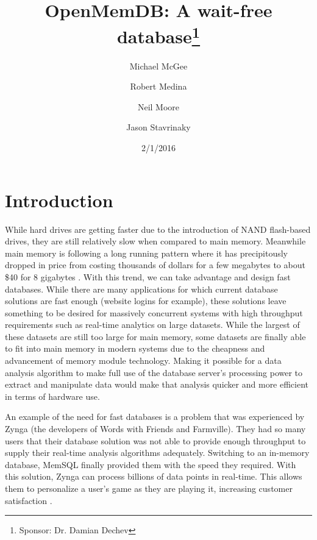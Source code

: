 \documentclass[letter,11pt]{article}
\title{OpenMemDB: A wait-free database\thanks{Sponsor: Dr. Damian Dechev}}
\author{Michael McGee \and Robert Medina \and Neil Moore \and Jason Stavrinaky}
\date{2/1/2016}
\begin{document}
\maketitle
\newpage


\section{Introduction}
While hard drives are getting faster due to the introduction of NAND flash-based drives,
they are still relatively slow when compared to main memory. Meanwhile main memory is following a long running 
pattern where it has precipitously dropped in price from costing thousands of dollars for a few 
megabytes to about \$40 for 8 gigabytes \cite{jcmit}. With this trend, we can take 
advantage and design fast databases. While there are many applications for 
which current database solutions are fast enough (website logins for example), these 
solutions leave something to be desired for massively concurrent systems with high throughput
requirements such as real-time analytics on large datasets. While the largest of 
these datasets are still too large for main memory, some datasets are finally able
to fit into main memory in modern systems due to the cheapness and advancement of 
memory module technology. Making it possible for a data analysis algorithm to make 
full use of the database server's processing power to extract and manipulate data
would make that analysis quicker and more efficient in terms of hardware use.
\par\vspace{\baselineskip}
An example of the need for fast databases is a problem that was experienced by Zynga 
(the developers of Words with Friends and Farmville). They had so many users that their database solution was
not able to provide enough throughput to supply their real-time analysis algorithms adequately. Switching to an
in-memory database, MemSQL finally provided them with the speed they required. With this 
solution, Zynga can process billions of data points in real-time. This allows them to personalize a user's game as they are playing it, increasing customer satisfaction \cite{MemSQL}.
\end{document}
